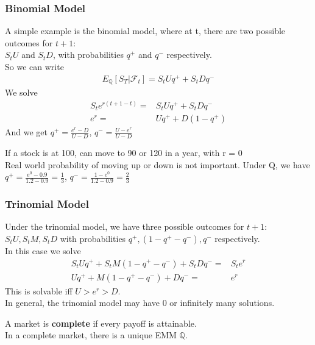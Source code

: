 \subsubsection{Binomial Model}
A simple example is the binomial model, where at t, there are two possible outcomes for $t+1$:\\
$S_t U$ and $S_t D$, with probabilities $q^+$ and $q^-$ respectively.\\
So we can write
\begin{align*}
    E_{\mathbb{Q}}[S_T | \mathcal{F}_t] = S_t U q^+ + S_t D q^-
\end{align*}
We solve
\begin{align*}
    S_t e^{r(t+1-t)} =& S_t U q^+ + S_t D q^- \\
    e^{r} =& U q^+ + D (1-q^+) 
\end{align*}
And we get $ q^+ = \frac{e^r - D}{U - D}$, $ q^- = \frac{U - e^r}{U - D}$ \\

\begin{example}
    If a stock is at 100, can move to 90 or 120 in a year, with r = 0\\
    Real world probability of moving up or down is not important.
    Under Q, we have $q^+ = \frac{e^0 - 0.9}{1.2 - 0.9} = \frac{1}{3}$, 
    $q^- = \frac{1 - e^0}{1.2 - 0.9} = \frac{2}{3}$
\end{example}

\subsubsection{Trinomial Model}
Under the trinomial model, we have three possible outcomes for $t+1$:\\
$S_t U, S_t M, S_t D$ with probabilities $q^+, (1 - q^+ - q^-), q^-$ respectively.\\
In this case we solve 
\begin{align*}
    S_t U q^+ + S_t M (1 - q^+ - q^-) + S_t D q^- =&  S_t e^{r}\\
    U q^+ + M (1 - q^+ - q^-) + D q^- =& e^{r}
\end{align*}
This is solvable iff $U > e^r > D$.\\
In general, the trinomial model may have 0 or infinitely many solutions.\\

\begin{theorem}
    A market is \textbf{complete} if every payoff is attainable.\\
    In a complete market, there is a unique EMM $\mathbb{Q}$.
\end{theorem}

